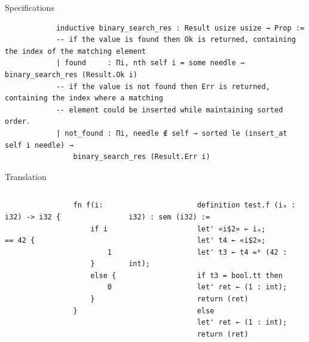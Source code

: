 \documentclass[usenames,dvipsnames,aspectratio=169]{beamer}
\begin{document}
\begin{frame}[fragile]{Specifications}
    \begin{block}{}
        \begin{verbatim}
            inductive binary_search_res : Result usize usize → Prop :=
            -- if the value is found then Ok is returned, containing the index of the matching element
            | found     : Πi, nth self i = some needle → binary_search_res (Result.Ok i)
            -- if the value is not found then Err is returned, containing the index where a matching
            -- element could be inserted while maintaining sorted order.
            | not_found : Πi, needle ∉ self → sorted le (insert_at self i needle) →
                binary_search_res (Result.Err i)
        \end{verbatim}
    \end{block}
\end{frame}

\begin{frame}[fragile]{Translation}
    \begin{columns}
        \begin{block}{}
            \begin{verbatim}
                fn f(i: i32) -> i32 {
                    if i == 42 {
                        1
                    }
                    else {
                        0
                    }
                }
            \end{verbatim}
        \end{block}

        \begin{block}{}
            \begin{verbatim}
                definition test.f (iₐ : i32) : sem (i32) :=
                let' «i$2» ← iₐ;
                let' t4 ← «i$2»;
                let' t3 ← t4 =ᵇ (42 : int);
                if t3 = bool.tt then
                let' ret ← (1 : int);
                return (ret)
                else
                let' ret ← (1 : int);
                return (ret)
            \end{verbatim}
        \end{block}
    \end{columns}
\end{frame}
\end{document}
